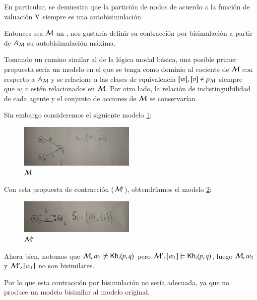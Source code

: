 En particular, se demuestra que la partición de nodos de acuerdo a la función de valuación $\mathrm{V}$ siempre es una autobisimulación.

Entonces sea $\mathcal{M}$ un \ults, nos gustaría definir su contracción por bisimulación a partir de $A_{\mathcal{M}}$ su autobisimulación máxima.

Tomando un camino similar al de la lógica modal básica, una posible primer propuesta sería un modelo en el que se tenga como dominio al cociente 
de $\mathcal{M}$ con respecto a $A_{\mathcal{M}}$ y se relacione a las clases de equivalencia $[w], [v] \in \rho_{\mathcal{M}}$ siempre que 
$w, v$ estén relacionados en $\mathcal{M}$. Por otro lado, la relación de indistinguibilidad de cada agente y el conjunto de acciones de $\mathcal{M}$ se conservarían.

Sin embargo consideremos el siguiente modelo \ref{fig:1st_proposal_original}:

\begin{figure}[h]
    \centering
    \includegraphics[width=0.5\textwidth]{imagenes/1ra_propuesta_original.jpeg}
    \caption{$\mathcal{M}$}
    \label{fig:1st_proposal_original}
\end{figure}

Con esta propuesta de contracción ($\mathcal{M}'$), obtendríamos el modelo \ref{fig:1st_proposal_contraction}:

\begin{figure}[h]
    \centering
    \includegraphics[width=0.5\textwidth]{imagenes/1ra_propuesta_contraido.jpeg}
    \caption{$\mathcal{M}'$}
    \label{fig:1st_proposal_contraction}
\end{figure}


Ahora bien, notemos que $\mathcal{M}, w_1 \not\models \mathsf{Kh}_i(p,q)$ pero $\mathcal{M}', [w_1] \models \mathsf{Kh}_i(p,q)$, luego $\mathcal{M},w_1$ y 
$\mathcal{M}',[w_1]$ no son bisimilares.

Por lo que esta contracción por bisimulación no sería adecuada, ya que no produce un modelo bisimilar al modelo original.

